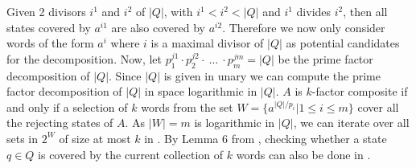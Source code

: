 Given 2 divisors $i^1$ and $i^2$ of $|Q|$, with $i^1 < i^2 <|Q|$ and $i^1$ divides $i^2$, then all states covered by $a^{i1}$ are also covered by $a^{i2}$. Therefore we now only consider words of the form $a^i$ where $i$ is a maximal divisor of $|Q|$ as potential candidates for the decomposition. Now, let $p_1^{j1} \cdot p_2^{j2} \cdot ~ \dots ~\cdot p_m^{jm} = |Q|$ be the prime factor decomposition of $|Q|$. Since $|Q|$ is given in unary we can compute the prime factor decomposition of $|Q|$ in space logarithmic in $|Q|$. $A$ is $k$-factor composite if and only if a selection of $k$ words from the set $W = \{a^{|Q|/p_i} | 1 \leq i \leq m\}$ cover all the rejecting states of $A$.  As $|W| = m$ is logarithmic in $|Q|$, we can iterate over all sets in $2^W$ of size at most $k$ in \LogSpace. By Lemma 6 from \cite{DBLP:journals/corr/abs-2107-04683}, checking whether a state $q \in Q$ is covered by the current collection of $k$ words can also be done in \LogSpace.

